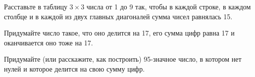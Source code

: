 ﻿
\begin{itemize}
\itA Расставьте в таблицу $3 \times 3$ числа от 1 до 9 так, чтобы в каждой строке, в каждом столбце и в каждой из двух главных диагоналей сумма чисел равнялась 15.

\itB Придумайте число такое, что оно делится на 17, его сумма цифр равна 17 и оканчивается оно тоже на 17.

\itC Придумайте (или расскажите, как построить) 95-значное число, в котором нет нулей и которое делится на свою сумму цифр.
\end{itemize}